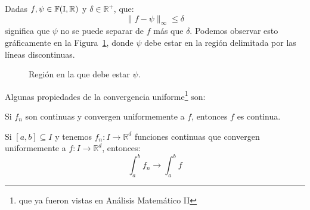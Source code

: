 \begin{ejemplo}
    Dadas $f,\psi \in \mathbb{F}(\text{I},\mathbb{R})$ y $\delta\in \mathbb{R}^+$, que:
    \begin{equation*}
        \|f-\psi\|_\infty \leq \delta
    \end{equation*}
    significa que $\psi$ no se puede separar de $f$ más que $\delta$. Podemos observar esto gráficamente en la Figura~\ref{fig:conv_unif}, donde $\psi$ debe estar en la región delimitada por las líneas discontinuas.
    \begin{figure}[H]
        \centering
        \caption{Región en la que debe estar $\psi$.}
        \label{fig:conv_unif}
    \end{figure}

\end{ejemplo}

\noindent
Algunas propiedades de la convergencia uniforme\footnote{que ya fueron vistas en Análisis Matemático II} son:
\begin{prop}
    Si $f_n$ son continuas y convergen uniformemente a $f$, entonces $f$ es continua.
\end{prop}

\begin{prop}
    Si $[a,b]\subseteq I$ y tenemos $f_n:I\rightarrow\mathbb{R}^d$ funciones continuas que convergen uniformemente a $f:I\rightarrow\mathbb{R}^d$, entonces:
    \begin{equation*}
        \int_{a}^{b} f_n \rightarrow \int_a^b f
    \end{equation*}
\end{prop}

